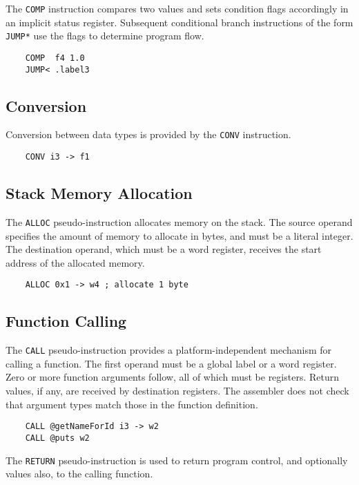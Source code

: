 The \texttt{COMP} instruction compares two values and sets condition flags
accordingly in an implicit status register. Subsequent conditional branch instructions of the
form \texttt{JUMP*} use the flags to determine program flow.

\begin{verbatim}
    COMP  f4 1.0
    JUMP< .label3
\end{verbatim}

\subsection{Conversion}

Conversion between data types is provided by the
\texttt{CONV} instruction.

\begin{verbatim}
    CONV i3 -> f1
\end{verbatim}

\subsection{Stack Memory Allocation}

The \texttt{ALLOC} pseudo-instruction allocates memory
on the stack. The source operand
specifies the amount of memory to allocate in bytes,
and must be a literal integer. The destination operand, which must
be a word register, receives the start address of the
allocated memory.

\begin{verbatim}
    ALLOC 0x1 -> w4 ; allocate 1 byte
\end{verbatim}

\subsection{Function Calling}

The \texttt{CALL} pseudo-instruction provides a platform-independent
mechanism for calling a function. The first operand must be
a global label or a word register. Zero or more function arguments follow,
all of which must be registers. Return values, if any, are received
by destination registers.
The assembler does not check that argument types match those
in the function definition.

\begin{verbatim}
    CALL @getNameForId i3 -> w2
    CALL @puts w2
\end{verbatim}

The \texttt{RETURN} pseudo-instruction is used to return program
control, and optionally values also, to the calling function.

